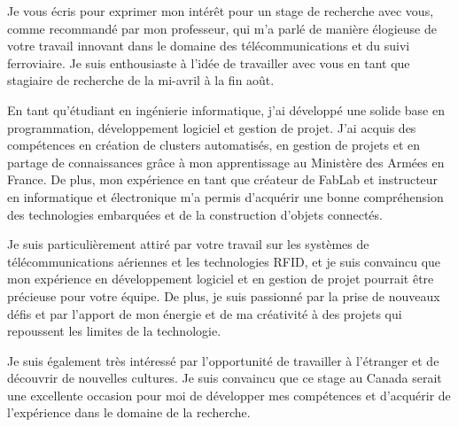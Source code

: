 \documentclass[11pt, a4paper]{awesome-cv}
\begin{document}
\hspace{8cm}\makeclheader[L]


\makelettertitle

\begin{cvletter}

Je vous écris pour exprimer mon intérêt pour un stage de recherche avec vous, comme recommandé par mon professeur, qui m'a parlé de manière élogieuse de votre travail innovant dans le domaine des télécommunications et du suivi ferroviaire. Je suis enthousiaste à l'idée de travailler avec vous en tant que stagiaire de recherche de la mi-avril à la fin août.

En tant qu'étudiant en ingénierie informatique, j'ai développé une solide base en programmation, développement logiciel et gestion de projet. J'ai acquis des compétences en création de clusters automatisés, en gestion de projets et en partage de connaissances grâce à mon apprentissage au Ministère des Armées en France. De plus, mon expérience en tant que créateur de FabLab et instructeur en informatique et électronique m'a permis d'acquérir une bonne compréhension des technologies embarquées et de la construction d'objets connectés.

Je suis particulièrement attiré par votre travail sur les systèmes de télécommunications aériennes et les technologies RFID, et je suis convaincu que mon expérience en développement logiciel et en gestion de projet pourrait être précieuse pour votre équipe. De plus, je suis passionné par la prise de nouveaux défis et par l'apport de mon énergie et de ma créativité à des projets qui repoussent les limites de la technologie.

Je suis également très intéressé par l'opportunité de travailler à l'étranger et de découvrir de nouvelles cultures. Je suis convaincu que ce stage au Canada serait une excellente occasion pour moi de développer mes compétences et d'acquérir de l'expérience dans le domaine de la recherche.

\end{cvletter}


\makeletterclosing
\end{document}
